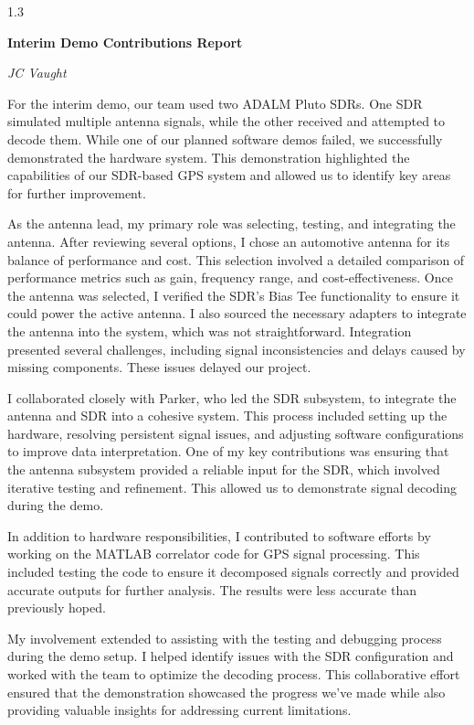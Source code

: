 \documentclass[12pt]{article}
\begin{document}
\begin{spacing}{1.3} %

\begin{center}
\textbf{\LARGE Interim Demo Contributions Report}

\textit{JC Vaught}
\end{center}

\vspace{1em}

For the interim demo, our team used two ADALM Pluto SDRs. One SDR simulated multiple antenna signals, while the other received and attempted to decode them. While one of our planned software demos failed, we successfully demonstrated the hardware system. This demonstration highlighted the capabilities of our SDR-based GPS system and allowed us to identify key areas for further improvement.

As the antenna lead, my primary role was selecting, testing, and integrating the antenna. After reviewing several options, I chose an automotive antenna for its balance of performance and cost. This selection involved a detailed comparison of performance metrics such as gain, frequency range, and cost-effectiveness. Once the antenna was selected, I verified the SDR’s Bias Tee functionality to ensure it could power the active antenna. I also sourced the necessary adapters to integrate the antenna into the system, which was not straightforward. Integration presented several challenges, including signal inconsistencies and delays caused by missing components. These issues delayed our project.

I collaborated closely with Parker, who led the SDR subsystem, to integrate the antenna and SDR into a cohesive system. This process included setting up the hardware, resolving persistent signal issues, and adjusting software configurations to improve data interpretation. One of my key contributions was ensuring that the antenna subsystem provided a reliable input for the SDR, which involved iterative testing and refinement. This allowed us to demonstrate signal decoding during the demo.

In addition to hardware responsibilities, I contributed to software efforts by working on the MATLAB correlator code for GPS signal processing. This included testing the code to ensure it decomposed signals correctly and provided accurate outputs for further analysis. The results were less accurate than previously hoped.

My involvement extended to assisting with the testing and debugging process during the demo setup. I helped identify issues with the SDR configuration and worked with the team to optimize the decoding process. This collaborative effort ensured that the demonstration showcased the progress we’ve made while also providing valuable insights for addressing current limitations.

\end{spacing} %
\end{document}
